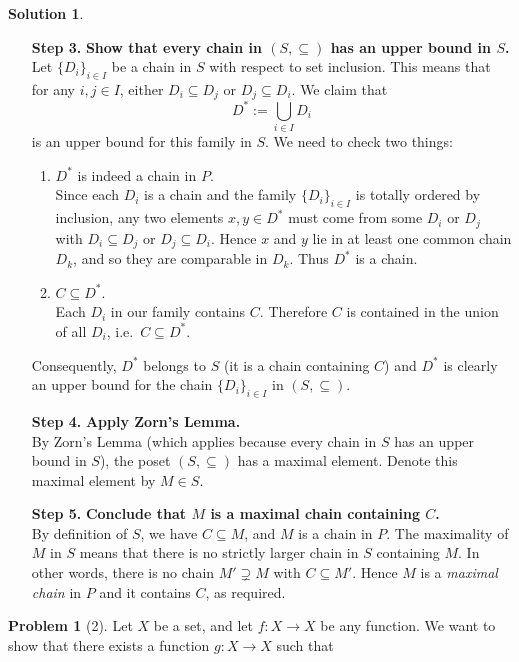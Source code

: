 \documentclass[12pt]{article}
\theoremstyle{definition} %
\newtheorem{solution}{Solution}
\newtheorem{problem}{Problem}
\theoremstyle{plain} %
\begin{document}
\begin{solution}
\begin{enumerate}
    \item[\textbf{Step 3.}] \textbf{Show that every chain in $(S, \subseteq)$ has an upper bound in $S$.}\\
    Let $\{D_i\}_{i \in I}$ be a chain in $S$ with respect to set inclusion. This means that for any $i, j \in I$, either $D_i \subseteq D_j$ or $D_j \subseteq D_i$. We claim that
    \[
        D^* := \bigcup_{i \in I} D_i
    \]
    is an upper bound for this family in $S$. We need to check two things:
    \begin{enumerate}
        \item $D^*$ is indeed a chain in $P$.\\
              Since each $D_i$ is a chain and the family $\{D_i\}_{i \in I}$ is totally ordered by inclusion, any two elements $x,y \in D^*$ must come from some $D_i$ or $D_j$ with $D_i \subseteq D_j$ or $D_j \subseteq D_i$. Hence $x$ and $y$ lie in at least one common chain $D_k$, and so they are comparable in $D_k$. Thus $D^*$ is a chain.
        \item $C \subseteq D^*$.\\
              Each $D_i$ in our family contains $C$. Therefore $C$ is contained in the union of all $D_i$, i.e.\ $C \subseteq D^*$. 
    \end{enumerate}
    Consequently, $D^*$ belongs to $S$ (it is a chain containing $C$) and $D^*$ is clearly an upper bound for the chain $\{D_i\}_{i \in I}$ in $(S, \subseteq)$.

    \item[\textbf{Step 4.}] \textbf{Apply Zorn's Lemma.}\\
    By Zorn's Lemma (which applies because every chain in $S$ has an upper bound in $S$), the poset $(S, \subseteq)$ has a maximal element. Denote this maximal element by $M \in S$.

    \item[\textbf{Step 5.}] \textbf{Conclude that $M$ is a maximal chain containing $C$.}\\
    By definition of $S$, we have $C \subseteq M$, and $M$ is a chain in $P$. The maximality of $M$ in $S$ means that there is no strictly larger chain in $S$ containing $M$. In other words, there is no chain $M' \supsetneq M$ with $C \subseteq M'$. Hence $M$ is a \emph{maximal chain} in $P$ and it contains $C$, as required.
\end{enumerate}
\end{solution}
\begin{problem}[2]
Let $X$ be a set, and let $f: X \to X$ be any function. We want to show that there exists a function $g: X \to X$ such that

\end{problem}
\end{document}
